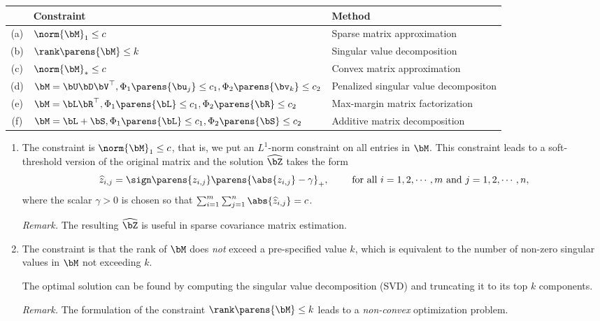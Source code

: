 \documentclass[12pt]{article}
\begin{document}
\begin{enumerate}[label=\textbf{\arabic*.}]
	\begin{center}
		\begin{tabular}{cll}
			\toprule
			& \textbf{Constraint} & \textbf{Method} \\
			\midrule
			(a) & $\norm{\bM}_{1} \le c$ & Sparse matrix approximation \\
			(b) & $\rank \parens{\bM} \le k$ & Singular value decomposition \\
			(c) & $\norm{\bM}_* \le c$ & Convex matrix approximation \\
			(d) & $\bM = \bU \bD \bV^\top, \Phi_1 \parens{\bu_j} \le c_1, \Phi_2 \parens{\bv_k} \le c_2$ & Penalized singular value decompositon \\
			(e) & $\bM = \bL \bR^\top, \Phi_1 \parens{\bL} \le c_1, \Phi_2 \parens{\bR} \le c_2$ & Max-margin matrix factorization \\
			(f) & $\bM = \bL + \bS, \Phi_1 \parens{\bL} \le c_1, \Phi_2 \parens{\bS} \le c_2$ & Additive matrix decomposition \\
			\bottomrule
		\end{tabular}
	\end{center}
	
	\begin{enumerate}
		\item The constraint is $\norm{\bM}_{1} \le c$, that is, we put an $L^1$-norm constraint on all entries in $\bM$. This constraint leads to a soft-threshold version of the original matrix and the solution $\widehat{\bZ}$ takes the form 
		\begin{align*}
			\widehat{z}_{i,j} = \sign \parens{z_{i,j}} \parens{\abs{z_{i,j}} - \gamma}_+, \qquad \text{ for all } i = 1, 2, \cdots, m \text{ and } j = 1, 2, \cdots, n, 
		\end{align*}
		where the scalar $\gamma > 0$ is chosen so that $\sum_{i=1}^m \sum_{j=1}^n \abs{\widehat{z}_{i,j}} = c$. 
		
		\textit{Remark.} The resulting $\widehat{\bZ}$ is useful in sparse covariance matrix estimation. 
		
		\item The constraint is that the rank of $\bM$ does \emph{not} exceed a pre-specified value $k$, which is equivalent to the number of non-zero singular values in $\bM$ not exceeding $k$. 
		
		The optimal solution can be found by computing the singular value decomposition (SVD) and truncating it to its top $k$ components. 
		
		\textit{Remark.} The formulation of the constraint $\rank \parens{\bM} \le k$ leads to a \emph{non-convex} optimization problem. 
		

\end{enumerate}
\end{enumerate}
\end{document}
